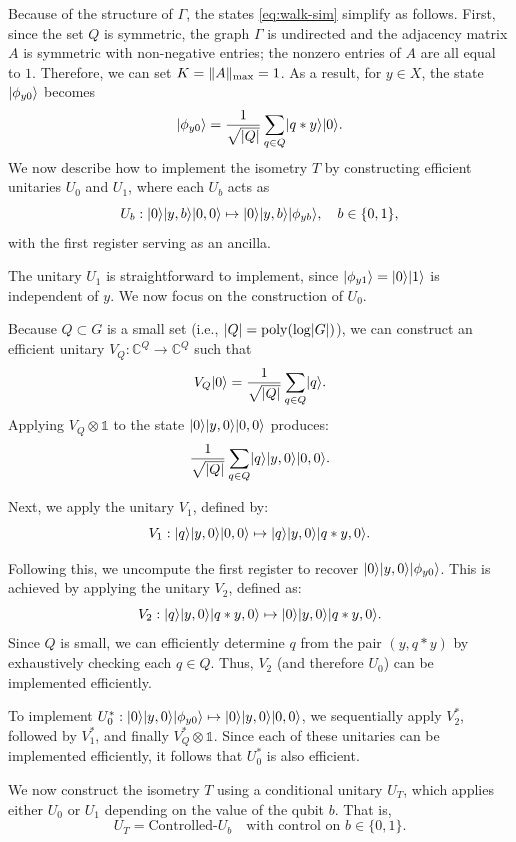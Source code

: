 \documentclass[12pt]{report}
\begin{document}
Because of the structure of $\Gamma$, the states \eqref{eq:walk-sim} simplify as follows. First, since the set $Q$ is symmetric, the graph $\Gamma$ is undirected and the adjacency matrix $A$ is symmetric with non-negative entries; the nonzero entries of $A$ are all equal to $1$. Therefore, we can set $K = \lVert A\rVert_{\mathrm{max}} = 1$. As a result, for $y \in X$, the state $\lvert\phi_{y0}\rangle$ becomes
\[ \lvert\phi_{y0}\rangle = \frac{1}{\sqrt{\lvert Q\rvert}} \sum_{q \in Q} \lvert q * y\rangle \lvert0\rangle. \]
We now describe how to implement the isometry \( T \) by constructing efficient unitaries \( U_0 \) and \( U_1 \), where each \( U_b \) acts as
\[
U_b : \lvert0\rangle \lvert y, b\rangle \lvert0, 0\rangle \mapsto \lvert0\rangle \lvert y, b\rangle \lvert\phi_{yb}\rangle, \quad b \in \{0, 1\},
\]
with the first register serving as an ancilla.

The unitary \( U_1 \) is straightforward to implement, since \( \lvert\phi_{y1}\rangle = \lvert0\rangle \lvert1\rangle \) is independent of \( y \). We now focus on the construction of \( U_0 \).

Because \( Q \subset G \) is a small set (i.e., \( \lvert Q\rvert = \operatorname{poly}(\log \lvert G\rvert) \)), we can construct an efficient unitary \( V_Q : \mathbb{C}^Q \to \mathbb{C}^Q \) such that
\[
V_Q \lvert0\rangle = \frac{1}{\sqrt{\lvert Q\rvert}} \sum_{q \in Q} \lvert q\rangle.
\]
Applying \( V_Q \otimes \mathds{1} \) to the state \( \lvert0\rangle \lvert y, 0\rangle \lvert0, 0\rangle \) produces:
\[
\frac{1}{\sqrt{\lvert Q\rvert}} \sum_{q \in Q} \lvert q\rangle \lvert y, 0\rangle \lvert0, 0\rangle.
\]

Next, we apply the unitary \( V_1 \), defined by:
\[
V_1 : \lvert q\rangle \lvert y, 0\rangle \lvert0, 0\rangle \mapsto \lvert q\rangle \lvert y, 0\rangle \lvert q * y, 0\rangle.
\]

Following this, we uncompute the first register to recover \( \lvert0\rangle \lvert y, 0\rangle \lvert\phi_{y0}\rangle \). This is achieved by applying the unitary \( V_2 \), defined as:
\[
V_2 : \lvert q\rangle \lvert y, 0\rangle \lvert q * y, 0\rangle \mapsto \lvert0\rangle \lvert y, 0\rangle \lvert q * y, 0\rangle.
\]
Since \( Q \) is small, we can efficiently determine \( q \) from the pair \( (y, q * y) \) by exhaustively checking each \( q \in Q \). Thus, \( V_2 \) (and therefore \( U_0 \)) can be implemented efficiently.


To implement \( U_0^* : \lvert0\rangle \lvert y, 0\rangle \lvert\phi_{y0}\rangle \mapsto \lvert0\rangle \lvert y, 0\rangle \lvert0, 0\rangle \), we sequentially apply \( V_2^* \), followed by \( V_1^* \), and finally \( V_Q^* \otimes \mathds{1} \). Since each of these unitaries can be implemented efficiently, it follows that \( U_0^* \) is also efficient.

We now construct the isometry \( T \) using a conditional unitary \( U_T \), which applies either \( U_0 \) or \( U_1 \) depending on the value of the qubit \( b \). That is,
\[
U_T = \text{Controlled-}U_b \quad \text{with control on } b \in \{0,1\}.
\]
\end{document}
